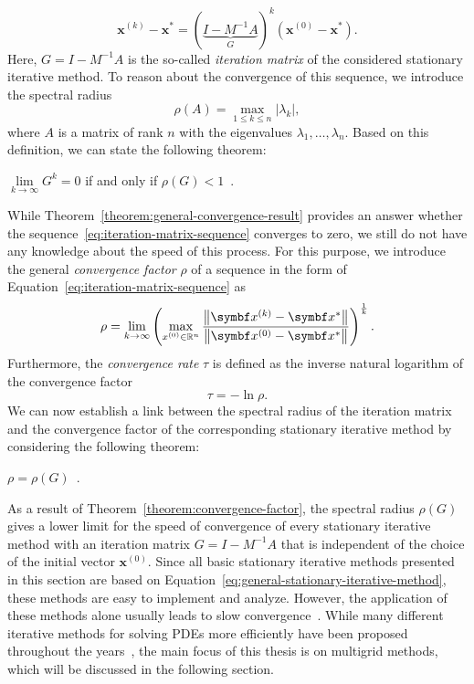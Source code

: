 \begin{equation}
	\bm{x}^{(k)} - \bm{x}^{*} = (\underbrace{I - M^{-1} A}_{G})^k (\bm{x}^{(0)} - \bm{x}^{*}).
	\label{eq:iteration-matrix-sequence}
\end{equation}
Here, $G = I - M^{-1} A$ is the so-called \emph{iteration matrix} of the considered stationary iterative method.
To reason about the convergence of this sequence, we introduce the spectral radius 
\begin{equation}
	\rho (A)=\max \limits_{1 \leq k \leq n} |\lambda _{k}|,
\end{equation}
where $A$ is a matrix of rank $n$ with the eigenvalues $\lambda_{1}, \dots, \lambda_{n}$.
Based on this definition, we can state the following theorem:
\begin{theorem}
$\lim \limits_{k \to  \infty} G^k = 0$ if and only if $\rho(G) < 1$~\cite{varga1962iterative,saad2003iterative}.
\label{theorem:general-convergence-result}
\end{theorem}

While Theorem~\ref{theorem:general-convergence-result} provides an answer whether the sequence~\eqref{eq:iteration-matrix-sequence} converges to zero, we still do not have any knowledge about the speed of this process.
For this purpose, we introduce the general \emph{convergence factor} $\rho$ of a sequence in the form of Equation~\eqref{eq:iteration-matrix-sequence} as
\begin{equation}
	\rho = \lim \limits_{k \to  \infty} \left( \max \limits_{x^{(0)} \in \mathbb{R}^{n}} \frac{\norm{\bm{x}^{(k)} - \bm{x}^{*}}}{\norm{\bm{x}^{(0)} - \bm{x}^{*}}} \right)^{\frac{1}{k}}.
\end{equation} 
Furthermore, the \emph{convergence rate} $\tau$ is defined as the inverse natural logarithm of the convergence factor
\begin{equation}
	\tau = -\ln \rho.
\end{equation}
We can now establish a link between the spectral radius of the iteration matrix and the convergence factor of the corresponding stationary iterative method by considering the following theorem:  
\begin{theorem}
	$\rho = \rho(G)$~\cite{varga1962iterative,saad2003iterative}.
	\label{theorem:convergence-factor}
\end{theorem}

As a result of Theorem~\ref{theorem:convergence-factor}, the spectral radius $\rho(G)$ gives a lower limit for the speed of convergence of every stationary iterative method with an iteration matrix $G = I - M^{-1} A$ that is independent of the choice of the initial vector $\bm{x}^{(0)}$.
Since all basic stationary iterative methods presented in this section are based on Equation~\eqref{eq:general-stationary-iterative-method}, these methods are easy to implement and analyze.
However, the application of these methods alone usually leads to slow convergence~\cite{briggs2000multigrid}.
While many different iterative methods for solving PDEs more efficiently have been proposed throughout the years~\cite{saad2003iterative}, the main focus of this thesis is on multigrid methods, which will be discussed in the following section.


